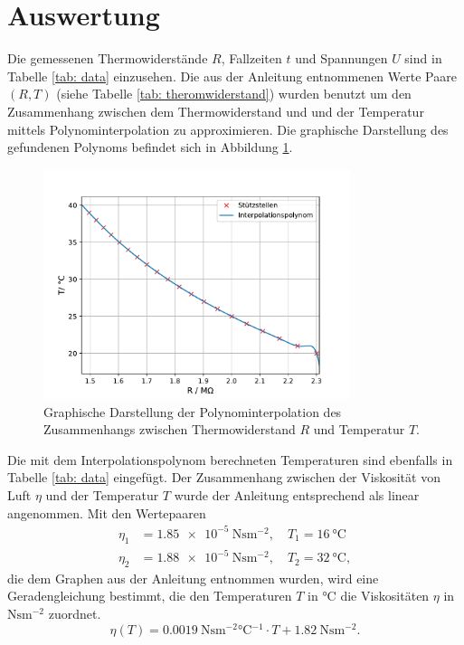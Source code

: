 \section{Auswertung}
Die gemessenen Thermowiderstände $R$, Fallzeiten $t$ und Spannungen $U$ sind in Tabelle \ref{tab: data} einzusehen.
Die aus der Anleitung entnommenen Werte Paare $(R, T)$ (siehe Tabelle \ref{tab: theromwiderstand}) wurden benutzt um den Zusammenhang %
zwischen dem Thermowiderstand und und der Temperatur mittels Polynominterpolation zu approximieren. Die graphische
Darstellung des gefundenen Polynoms befindet sich in Abbildung \ref{fig: poly}.

\begin{figure}[H]
  \centering
  \includegraphics[width = 0.8\textwidth]{../Messdaten/temperature_fit.pdf}
  \caption{Graphische Darstellung der Polynominterpolation des Zusammenhangs zwischen Thermowiderstand $R$ und Temperatur $T$.}
  \label{fig: poly}
\end{figure}
 Die mit dem Interpolationspolynom berechneten
Temperaturen sind ebenfalls in Tabelle \ref{tab: data} eingefügt. Der Zusammenhang zwischen der Viskosität von Luft $\eta$ und
der Temperatur $T$ wurde der Anleitung \cite{anleitung503} entsprechend als linear angenommen. Mit den Wertepaaren
\begin{align}
  \eta_1 &= \SI{1.85e-5}{\newton\second\meter^{-2}}, \quad T_1 = \SI{16}{\celsius} \\
  \eta_2 &= \SI{1.88e-5}{\newton\second\meter^{-2}}, \quad T_2 = \SI{32}{\celsius},
\end{align}
die dem Graphen aus der Anleitung entnommen wurden, wird eine Geradengleichung bestimmt, die den Temperaturen
$T$ in $\si{\celsius}$ die Viskositäten $\eta$ in $\si{\newton\second\meter^{-2}}$ zuordnet.
\begin{equation}
  \eta(T) = \SI{0.0019}{\newton\second\meter^{-2} \celsius^{-1} } \cdot  T  + \SI{1.82}{\newton\second\meter^{-2}}.
\end{equation}
